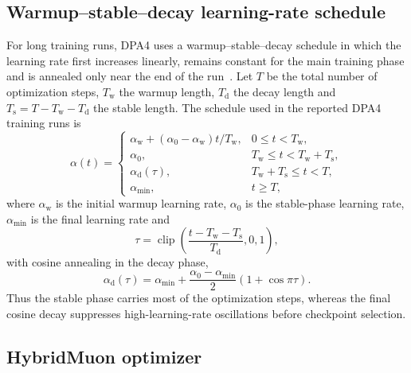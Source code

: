 \subsection{Warmup--stable--decay learning-rate schedule}
\label{sec:sm-wsd-schedule}

For long training runs, DPA4 uses a warmup--stable--decay schedule in which the learning rate first increases linearly, remains constant for the main training phase and is annealed only near the end of the run~\cite{wen2024wsd}.
Let $T$ be the total number of optimization steps, $T_{\mathrm{w}}$ the warmup length, $T_{\mathrm{d}}$ the decay length and $T_{\mathrm{s}}=T-T_{\mathrm{w}}-T_{\mathrm{d}}$ the stable length.
The
schedule used in the reported DPA4 training runs is
\begin{equation}
    \alpha(t)=
    \begin{cases}
        \alpha_{\mathrm{w}}
        +(\alpha_0-\alpha_{\mathrm{w}})t/T_{\mathrm{w}},
         & 0\le t<T_{\mathrm{w}},                             \\[3pt]
        \alpha_0,
         & T_{\mathrm{w}}\le t<T_{\mathrm{w}}+T_{\mathrm{s}}, \\[3pt]
        \alpha_{\mathrm{d}}(\tau),
         & T_{\mathrm{w}}+T_{\mathrm{s}}\le t<T,              \\[3pt]
        \alpha_{\min},
         & t\ge T,
    \end{cases}
    \label{eq:sm-wsd-piecewise}
\end{equation}
where $\alpha_{\mathrm{w}}$ is the initial warmup learning rate,
$\alpha_0$ is the stable-phase learning rate,
$\alpha_{\min}$ is the final learning rate and
\begin{equation}
    \tau
    =
    \operatorname{clip}
    \left(
    \frac{t-T_{\mathrm{w}}-T_{\mathrm{s}}}{T_{\mathrm{d}}},
    0,1
    \right),
    \label{eq:sm-wsd-tau}
\end{equation}
with cosine annealing in the decay phase,
\begin{equation}
    \alpha_{\mathrm{d}}(\tau)
    =
    \alpha_{\min}
    +
    \frac{\alpha_0-\alpha_{\min}}{2}
    \left(1+\cos \pi\tau\right).
    \label{eq:sm-wsd-cosine}
\end{equation}
Thus the stable phase carries most of the optimization steps, whereas the final cosine decay suppresses high-learning-rate oscillations before checkpoint selection.

\subsection{HybridMuon optimizer}
\label{sec:sm-hybrid-muon}

